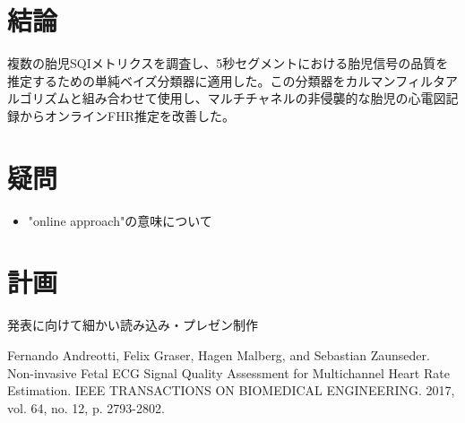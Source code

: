 \documentclass[dvipdfmx]{jsarticle}
\begin{document}
\section{結論}
複数の胎児SQIメトリクスを調査し、5秒セグメントにおける胎児信号の品質を推定するための単純ベイズ分類器に適用した。この分類器をカルマンフィルタアルゴリズムと組み合わせて使用し、マルチチャネルの非侵襲的な胎児の心電図記録からオンラインFHR推定を改善した。
\section{疑問}
\begin{itemize}
    \item "online approach"の意味について
\end{itemize}
\section{計画}
発表に向けて細かい読み込み・プレゼン制作
\begin{thebibliography}{}
\item Fernando Andreotti, Felix Graser, Hagen Malberg, and Sebastian Zaunseder. Non-invasive Fetal ECG Signal Quality Assessment for Multichannel Heart Rate Estimation. IEEE TRANSACTIONS ON BIOMEDICAL ENGINEERING. 2017, vol. 64, no. 12, p. 2793-2802.
\end{thebibliography}
\end{document}
